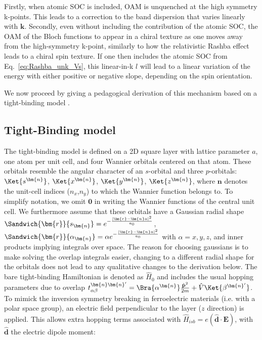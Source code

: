 Firstly, when atomic SOC is included, OAM is unquenched at the high symmetry k-points. This leads to a correction to the band dispersion that varies linearly with $\bm{k}$. Secondly, even without including the contribution of the atomic SOC, the OAM of the Bloch functions to appear in a chiral texture as one moves away from the high-symmetry k-point, similarly to how the relativistic Rashba effect leads to a chiral spin texture. If one then includes the atomic SOC from Eq.~\ref{eq:Rashba_unk_Vs}, this linear-in-k $l$ will lead to a linear variation of the energy with either positive or negative slope, depending on the spin orientation.

We now proceed by giving a pedagogical derivation of this mechanism based on a tight-binding model \cite{Petersen2000,Go2016}.

\subsection{Tight-Binding model}
The tight-binding model is defined on a 2D square layer with lattice parameter $a$, one atom per unit cell, and four Wannier orbitals centered on that atom.
These orbitals resemble the angular character of an $s$-orbital and three $p$-orbitals: $\Ket{s^{\bm{n}}}$, $\Ket{x^{\bm{n}}}$, $\Ket{y^{\bm{n}}}$, $\Ket{z^{\bm{n}}}$, where $\bm{n}$ denotes the unit-cell indices ($n_x$,$n_y$) to which the Wannier function belongs to.
To simplify notation, we omit $\bm{0}$ in writing the Wannier functions of the central unit cell.
We furthermore assume that these orbitals have a Gaussian radial shape $\Sandwich{\bm{r}}{s_{\bm{n}}} = e^{-\frac{|\bm{r}-\bm{n}a|^2}{a_0}}$, $\Sandwich{\bm{r}}{\alpha_{\bm{n}}} = \alpha e^{-\frac{|\bm{r}-\bm{n}a|^2}{a_0}}$ with $\alpha = x, y, z$, and inner products implying integrals over space.
The reason for choosing gaussians is to make solving the overlap integrals easier, changing to a different radial shape for the orbitals does not lead to any qualitative changes to the derivation below.
The bare tight-binding Hamiltonian is denoted as $\hat{H}_0$ and includes the usual hopping parameters due to overlap $t_{\alpha\beta}^{\bm{n}\bm{n}'} = \Bra{\alpha^{\bm{n}}}\frac{\hat{\mathbf{p}}^2}{2m} + \hat{V}\Ket{\beta^{\bm{n}'}}$.
To mimick the inversion symmetry breaking in ferroelectric materials (i.e. with a polar space group), an electric field perpendicular to the layer ($z$ direction) is applied.
This allows extra hopping terms associated with $\hat{H}_{isb} = e (\hat{\bm{d}}\cdot \bm{E})$, with $\hat{\bm{d}}$ the electric dipole moment:
